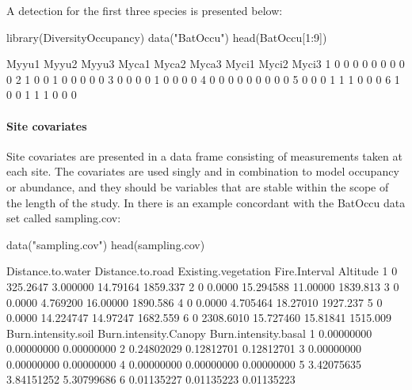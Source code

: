 \documentclass[article]{jss}
\begin{document}
A detection for the first three species is presented below:

\begin{CodeChunk}
\begin{CodeInput}
library(DiversityOccupancy)
data("BatOccu")
head(BatOccu[1:9])
\end{CodeInput}
\begin{CodeOutput}
  Myyu1 Myyu2 Myyu3 Myca1 Myca2 Myca3 Myci1 Myci2 Myci3
1     0     0     0     0     0     0     0     0     0
2     1     0     0     1     0     0     0     0     0
3     0     0     0     0     1     0     0     0     0
4     0     0     0     0     0     0     0     0     0
5     0     0     0     1     1     1     0     0     0
6     1     0     0     1     1     1     0     0     0
\end{CodeOutput}
\end{CodeChunk}

\paragraph{Site covariates}\label{site-covariates}

Site covariates are presented in a data frame consisting of measurements
taken at each site. The covariates are used singly and in combination to
model occupancy or abundance, and they should be variables that are
stable within the scope of the length of the study. In
 there is an example concordant with the BatOccu
data set called sampling.cov:

\begin{CodeChunk}
\begin{CodeInput}
data("sampling.cov")
head(sampling.cov)
\end{CodeInput}
\end{CodeChunk}

\begin{CodeChunk}
\begin{CodeOutput}
  Distance.to.water Distance.to.road Existing.vegetation Fire.Interval Altitude
1                 0         325.2647            3.000000      14.79164 1859.337
2                 0           0.0000           15.294588      11.00000 1839.813
3                 0           0.0000            4.769200      16.00000 1890.586
4                 0           0.0000            4.705464      18.27010 1927.237
5                 0           0.0000           14.224747      14.97247 1682.559
6                 0        2308.6010           15.727460      15.81841 1515.009
  Burn.intensity.soil Burn.intensity.Canopy Burn.intensity.basal
1          0.00000000            0.00000000           0.00000000
2          0.24802029            0.12812701           0.12812701
3          0.00000000            0.00000000           0.00000000
4          0.00000000            0.00000000           0.00000000
5          3.42075635            3.84151252           5.30799686
6          0.01135227            0.01135223           0.01135223
\end{CodeOutput}
\end{CodeChunk}
\end{document}
